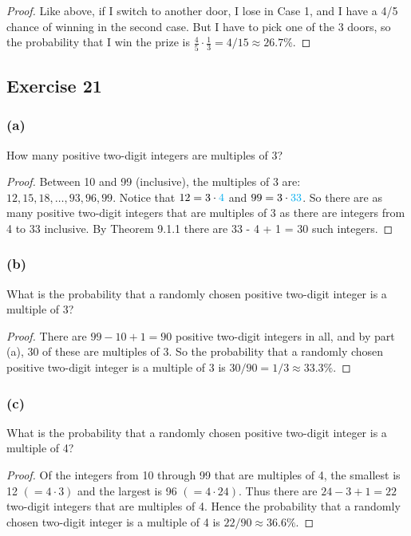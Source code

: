 \documentclass[14pt]{extarticle}
\newcommand{\cy}{\color{cyan}}
\begin{document}
\begin{proof}
Like above, if I switch to another door, I lose in Case 1, and I have a 4/5 chance of winning in the second case. But I have 
to pick one of the 3 doors, so the probability that I win the prize is \(\frac{4}{5} \cdot \frac{1}{3} = 4/15 \approx 26.7\%\).
\end{proof}

\subsection{Exercise 21}
\subsubsection{(a)}
How many positive two-digit integers are multiples of 3?

\begin{proof}
Between 10 and 99 (inclusive), the multiples of 3 are: \(12, 15, 18, \ldots, 93, 96, 99\). Notice that
\(12 = 3 \cdot {\cy 4}\) and \(99 = 3 \cdot {\cy 33}\). So there are as many positive two-digit integers that are 
multiples of 3 as there are integers from 4 to 33 inclusive. By Theorem 9.1.1 there are 33 - 4 + 1 = 30 such
integers.
\end{proof}

\subsubsection{(b)}
What is the probability that a randomly chosen positive two-digit integer is a multiple of 3?

\begin{proof}
There are \(99 - 10 + 1 = 90\) positive two-digit integers in all, and by part (a), 30 of these are multiples of 3. So 
the probability that a randomly chosen positive two-digit integer is a multiple of 3 is \(30/90=1/3 \approx 33.3\%\).
\end{proof}

\subsubsection{(c)}
What is the probability that a randomly chosen positive two-digit integer is a multiple of 4?

\begin{proof}
Of the integers from 10 through 99 that are multiples of 4, the smallest is 12 \((= 4 \cdot 3)\) and the largest is 96 
\((= 4 \cdot 24)\). Thus there are \(24 - 3 + 1 = 22\) two-digit integers that are multiples of 4. Hence the 
probability that a randomly chosen two-digit integer is a multiple of 4 is \(22/90 \approx 36.6\%\).
\end{proof}
\end{document}
